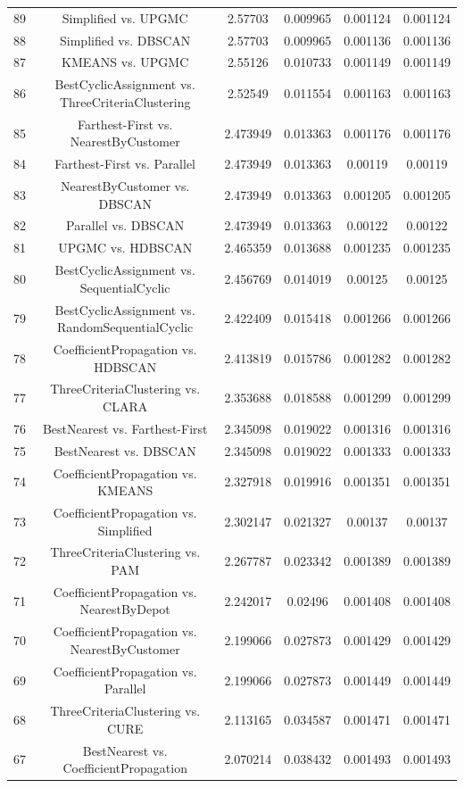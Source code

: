 \documentclass[a4paper,10pt]{article}
\begin{document}
\begin{landscape}
\begin{table}[!htp]
\begin{tabular}{cccccc}
89&Simplified vs. UPGMC&2.57703&0.009965&0.001124&0.001124\\
88&Simplified vs. DBSCAN&2.57703&0.009965&0.001136&0.001136\\
87&KMEANS vs. UPGMC&2.55126&0.010733&0.001149&0.001149\\
86&BestCyclicAssignment vs. ThreeCriteriaClustering&2.52549&0.011554&0.001163&0.001163\\
85&Farthest-First vs. NearestByCustomer&2.473949&0.013363&0.001176&0.001176\\
84&Farthest-First vs. Parallel&2.473949&0.013363&0.00119&0.00119\\
83&NearestByCustomer vs. DBSCAN&2.473949&0.013363&0.001205&0.001205\\
82&Parallel vs. DBSCAN&2.473949&0.013363&0.00122&0.00122\\
81&UPGMC vs. HDBSCAN&2.465359&0.013688&0.001235&0.001235\\
80&BestCyclicAssignment vs. SequentialCyclic&2.456769&0.014019&0.00125&0.00125\\
79&BestCyclicAssignment vs. RandomSequentialCyclic&2.422409&0.015418&0.001266&0.001266\\
78&CoefficientPropagation vs. HDBSCAN&2.413819&0.015786&0.001282&0.001282\\
77&ThreeCriteriaClustering vs. CLARA&2.353688&0.018588&0.001299&0.001299\\
76&BestNearest vs. Farthest-First&2.345098&0.019022&0.001316&0.001316\\
75&BestNearest vs. DBSCAN&2.345098&0.019022&0.001333&0.001333\\
74&CoefficientPropagation vs. KMEANS&2.327918&0.019916&0.001351&0.001351\\
73&CoefficientPropagation vs. Simplified&2.302147&0.021327&0.00137&0.00137\\
72&ThreeCriteriaClustering vs. PAM&2.267787&0.023342&0.001389&0.001389\\
71&CoefficientPropagation vs. NearestByDepot&2.242017&0.02496&0.001408&0.001408\\
70&CoefficientPropagation vs. NearestByCustomer&2.199066&0.027873&0.001429&0.001429\\
69&CoefficientPropagation vs. Parallel&2.199066&0.027873&0.001449&0.001449\\
68&ThreeCriteriaClustering vs. CURE&2.113165&0.034587&0.001471&0.001471\\
67&BestNearest vs. CoefficientPropagation&2.070214&0.038432&0.001493&0.001493\\

\end{tabular}
\end{table}
\end{landscape}
\end{document}
